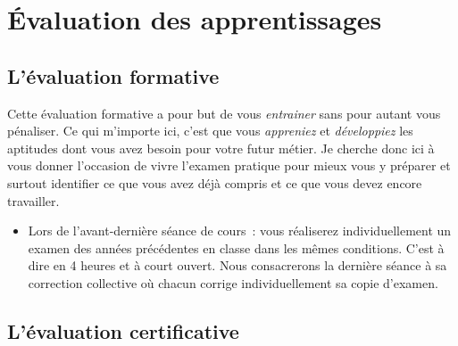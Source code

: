 \clearpage
\section{Évaluation des apprentissages}

\subsection{L’évaluation formative}

\label{eval_formative}
Cette évaluation formative a pour but de vous \emph{entrainer} sans pour autant vous pénaliser. Ce qui m'importe ici, c'est que vous \emph{appreniez} et \emph{développiez} les aptitudes dont vous avez besoin pour votre futur métier. Je cherche donc ici à vous donner l'occasion de vivre l'examen pratique pour mieux vous y préparer et surtout identifier ce que vous avez déjà compris et ce que vous devez encore travailler.
\begin{itemize}
    \item Lors de l'avant-dernière séance de cours~: vous réaliserez individuellement un examen des années précédentes en classe dans les mêmes conditions. C'est à dire en 4 heures et à court ouvert. Nous consacrerons la dernière séance à sa correction collective où chacun corrige individuellement sa copie d'examen.
\end{itemize}

\subsection{L’évaluation certificative}

